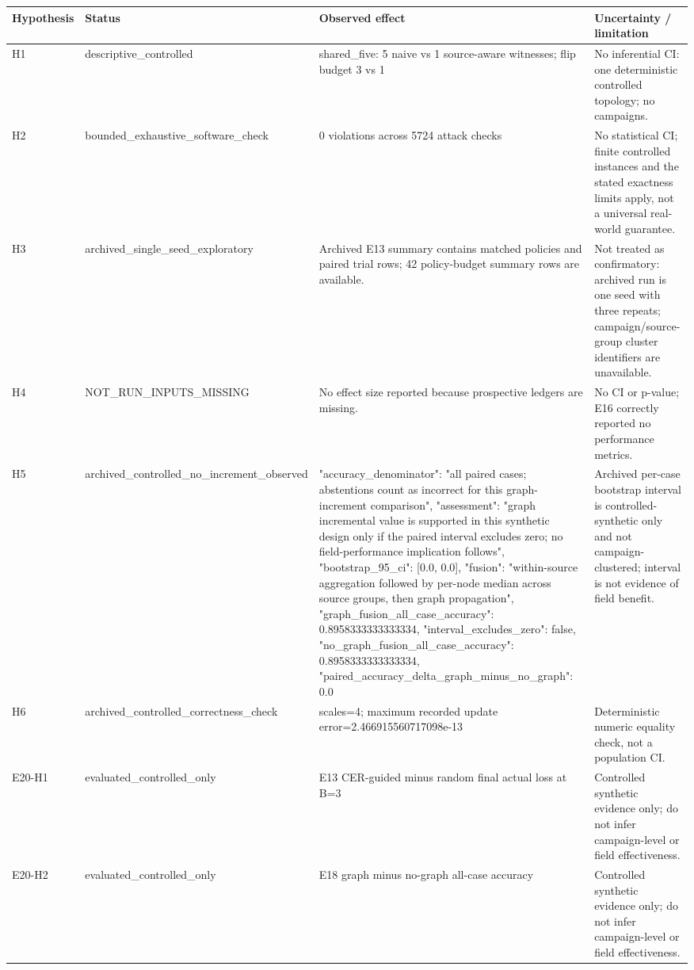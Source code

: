 \begin{tabular}{llp{6.5cm}p{4.5cm}}
Hypothesis & Status & Observed effect & Uncertainty / limitation \\
\hline
H1 & descriptive\_controlled & shared\_five: 5 naive vs 1 source-aware witnesses; flip budget 3 vs 1 & No inferential CI: one deterministic controlled topology; no campaigns. \\
H2 & bounded\_exhaustive\_software\_check & 0 violations across 5724 attack checks & No statistical CI; finite controlled instances and the stated exactness limits apply, not a universal real-world guarantee. \\
H3 & archived\_single\_seed\_exploratory & Archived E13 summary contains matched policies and paired trial rows; 42 policy-budget summary rows are available. & Not treated as confirmatory: archived run is one seed with three repeats; campaign/source-group cluster identifiers are unavailable. \\
H4 & NOT\_RUN\_INPUTS\_MISSING & No effect size reported because prospective ledgers are missing. & No CI or p-value; E16 correctly reported no performance metrics. \\
H5 & archived\_controlled\_no\_increment\_observed & {"accuracy\_denominator": "all paired cases; abstentions count as incorrect for this graph-increment comparison", "assessment": "graph incremental value is supported in this synthetic design only if the paired interval excludes zero; no field-performance implication follows", "bootstrap\_95\_ci": [0.0, 0.0], "fusion": "within-source aggregation followed by per-node median across source groups, then graph propagation", "graph\_fusion\_all\_case\_accuracy": 0.8958333333333334, "interval\_excludes\_zero": false, "no\_graph\_fusion\_all\_case\_accuracy": 0.8958333333333334, "paired\_accuracy\_delta\_graph\_minus\_no\_graph": 0.0} & Archived per-case bootstrap interval is controlled-synthetic only and not campaign-clustered; interval is not evidence of field benefit. \\
H6 & archived\_controlled\_correctness\_check & scales=4; maximum recorded update error=2.466915560717098e-13 & Deterministic numeric equality check, not a population CI. \\
E20-H1 & evaluated\_controlled\_only & E13 CER-guided minus random final actual loss at B=3 & Controlled synthetic evidence only; do not infer campaign-level or field effectiveness. \\
E20-H2 & evaluated\_controlled\_only & E18 graph minus no-graph all-case accuracy & Controlled synthetic evidence only; do not infer campaign-level or field effectiveness. \\
\end{tabular}
